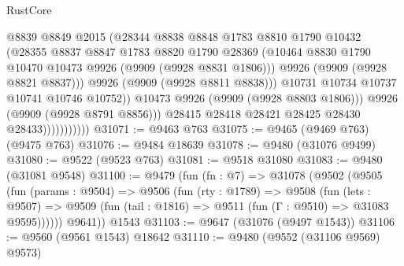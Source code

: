 \begin{lexlean}{RustCore}
\begin{coremodule}
                                  @8839
                                  @8849
                                  @2015
                                  (@28344
                                    @8838
                                    @8848
                                    @1783
                                    @8810
                                    @1790
                                    @10432
                                    (@28355
                                      @8837
                                      @8847
                                      @1783
                                      @8820
                                      @1790
                                      @28369
                                      (@10464
                                        @8830
                                        @1790
                                        @10470
                                        @10473
                                        @9926
                                        (@9909 (@9928 @8831 @1806)))
                                      @9926
                                      (@9909 (@9928 @8821 @8837)))
                                    @9926
                                    (@9909 (@9928 @8811 @8838)))
                                  @10731
                                  @10734
                                  @10737
                                  @10741
                                  @10746
                                  @10752))
                              @10473
                              @9926
                              (@9909 (@9928 @8803 @1806)))
                            @9926
                            (@9909 (@9928 @8791 @8856)))
                          @28415
                          @28418
                          @28421
                          @28425
                          @28430
                          @28433)))))))))))
@31071 := @9463 @763
@31075 := @9465 (@9469 @763) (@9475 @763)
@31076 := @9484 @18639
@31078 := @9480 (@31076 @9499)
@31080 := @9522 (@9523 @763)
@31081 := @9518 @31080
@31083 := @9480 (@31081 @9548)
@31100 := @9479
    (fun (fn : @7) =>
    @31078
      (@9502
        (@9505
          (fun (params : @9504) =>
          @9506
            (fun (rty : @1789) =>
            @9508
              (fun (lets : @9507) =>
              @9509 (fun (tail : @1816) => @9511 (fun (Γ : @9510) => @31083 @9595))))))
        @9641))
    @1543
@31103 := @9647 (@31076 (@9497 @1543))
@31106 := @9560 (@9561 @1543) @18642
@31110 := @9480 (@9552 (@31106 @9569) @9573)

\end{coremodule}
\end{lexlean}
